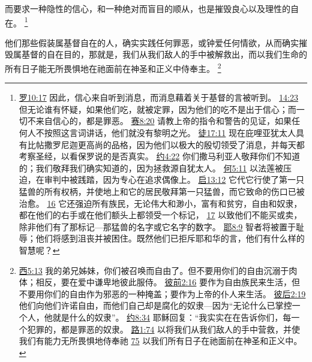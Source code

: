 \documentclass[12pt, a4paper, oneside]{ctexart}
\newcounter{parnum}[section]
\newcommand{\N}{%
   \noindent\refstepcounter{parnum}%
    \makebox[\parindent][l]{\textbf{\arabic{parnum}.}}}
\begin{document}
	而要求一种隐性的信心，和一种绝对而盲目的顺从，也是摧毁良心以及理性的自在。
	\footnote {
		\href{https://biblehub.com/romans/10-17.htm}{罗10:17} 因此，信心来自听到消息，而消息藉着关于基督的言被听到。
		\href{https://biblehub.com/romans/14-23.htm}{14:23} 但无论谁有怀疑，如果他们吃，就被定罪，因为他们的吃不是出于信心；而一切不来自信心的，都是罪恶。
		\href{https://biblehub.com/isaiah/8-20.htm}{赛8:20} 请教上帝的指令和警告的见证，如果任何人不按照这言词讲话，他们就没有黎明之光。
		\href{https://biblehub.com/acts/17-11.htm}{徒17:11} 现在庇哩亚犹太人具有比帖撒罗尼迦更高尚的品格，因为他们以极大的殷切领受了消息，并每天都考察圣经，以看保罗说的是否真实。
		\href{https://biblehub.com/john/4-22.htm}{约4:22} 你们撒马利亚人敬拜你们不知道的；我们敬拜我们确实知道的，因为拯救源自犹太人。
		\href{https://biblehub.com/hosea/5-11.htm}{何5:11} 以法莲被压迫，在审判中被践踏，因为专心在追求偶像上。
		\href{https://biblehub.com/revelation/13-12.htm}{启13:12} 它代它行使了第一只猛兽的所有权柄，并使地上和它的居民敬拜第一只猛兽，而它致命的伤口已被治愈。
		\href{https://biblehub.com/revelation/13-16.htm}{16} 它还强迫所有族民，无论伟大和渺小，富有和贫穷，自由和奴隶，都在他们的右手或在他们额头上都领受一个标记，
		\href{https://biblehub.com/revelation/13-17.htm}{17} 以致他们不能买或卖，除非他们有了那标记---那猛兽的名字或它名字的数字。
		\href{https://biblehub.com/jeremiah/8-9.htm}{耶8:9} 智者将被置于耻辱；他们将感到沮丧并被困住。既然他们已拒斥耶和华的言，他们有什么样的智慧呢？
	}

\N 他们那些假装属基督自在的人，确实实践任何罪恶，或钟爱任何情欲，从而确实摧毁属基督的自在目的，那就是，我们从我们敌人的手中被解救出，而以我们生命的所有日子能无所畏惧地在祂面前在神圣和正义中侍奉主。
	\footnote {
		\href{https://biblehub.com/galatians/5-13.htm}{西5:13} 我的弟兄姊妹，你们被召唤而自由了。但不要用你们的自由沉溺于肉体；相反，要在爱中谦卑地彼此服侍。
		\href{https://biblehub.com/1_peter/2-16.htm}{彼前2:16} 要作为自由族民来生活，但不要用你们的自由作为邪恶的一种掩盖；要作为上帝的仆人来生活。
		\href{https://biblehub.com/2_peter/2-19.htm}{彼后2:19} 他们向他们许诺自由，而他们自己却是腐化的奴隶---因为“无论什么已掌控一个人，他就是什么的奴隶”。
		\href{https://biblehub.com/john/8-34.htm}{约8:34} 耶稣回复：“我实实在在告诉你们，每一个犯罪的，都是罪恶的奴隶。
		\href{https://biblehub.com/luke/1-74.htm}{路1:74} 以将我们从我们敌人的手中营救，并使我们有能力无所畏惧地侍奉祂
		\href{https://biblehub.com/luke/1-75.htm}{75} 以我们所有日子在祂面前在神圣和正义中。
	}
\end{document}

